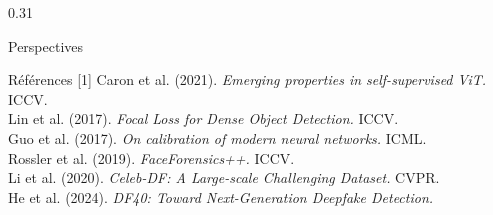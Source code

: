 \documentclass[final]{beamer}
\begin{document}
\begin{frame}[t]
\begin{columns}[t]
\begin{column}{0.31\linewidth}
\begin{block}{Perspectives}
\vspace{10pt}
\begin{block}{Références}
\tiny
[1] Caron et al. (2021). \textit{Emerging properties in self-supervised ViT.} ICCV.\\
[2] Lin et al. (2017). \textit{Focal Loss for Dense Object Detection.} ICCV.\\
[3] Guo et al. (2017). \textit{On calibration of modern neural networks.} ICML.\\
[4] Rossler et al. (2019). \textit{FaceForensics++.} ICCV.\\
[5] Li et al. (2020). \textit{Celeb-DF: A Large-scale Challenging Dataset.} CVPR.\\
[6] He et al. (2024). \textit{DF40: Toward Next-Generation Deepfake Detection.}
\end{block}
\end{block}
\end{column}

\end{columns}

\end{frame}
\end{document}
